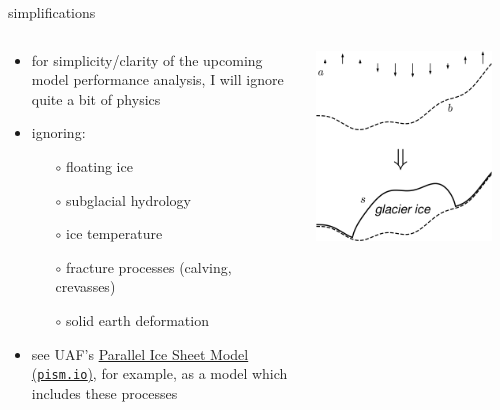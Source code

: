 \documentclass[svgnames,
               hyperref={colorlinks,citecolor=DeepPink4,linkcolor=FireBrick,urlcolor=Maroon},
               usepdftitle=false]  %
               {beamer}
\begin{document}
\begin{frame}{simplifications}

\begin{columns}
\begin{column}{0.6\textwidth}
\begin{itemize}
\item for simplicity/clarity of the upcoming model performance analysis, I will ignore quite a bit of physics
\item \alert{ignoring}:
    \begin{itemize}
    \item[$\circ$] floating ice
    \item[$\circ$] subglacial hydrology
    \item[$\circ$] ice temperature
    \item[$\circ$] fracture processes (calving, crevasses)
    \item[$\circ$] solid earth deformation
    \end{itemize}

\medskip
\item<2> {\footnotesize see UAF's \href{https://pism.io/}{Parallel Ice Sheet Model (\texttt{pism.io})}, for example, as a model which includes these processes}
\end{itemize}
\end{column}
\begin{column}{0.42\textwidth}
\hfill \includegraphics[width=0.9\textwidth]{images/map-glacier-ice.png}
\end{column}
\end{columns}
\end{frame}
\end{document}
